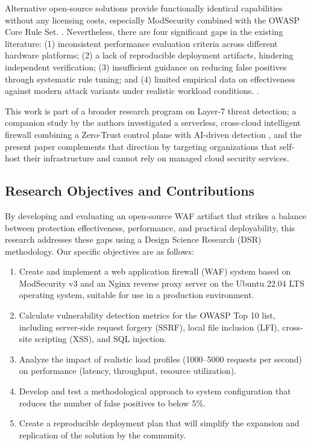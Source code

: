 \documentclass[10pt,conference]{IEEEtran}
\begin{document}
Alternative open-source solutions provide functionally identical capabilities without any licensing costs, especially ModSecurity combined with the OWASP Core Rule Set. \cite{owasp_modsec,mukhtar2020}. Nevertheless, there are four significant gaps in the existing literature: (1) inconsistent performance evaluation criteria across different hardware platforms; (2) a lack of reproducible deployment artifacts, hindering independent verification; (3) insufficient guidance on reducing false positives through systematic rule tuning; and (4) limited empirical data on effectiveness against modern attack variants under realistic workload conditions. \cite{pratama2023,gzyl2023}.

This work is part of a broader research program on Layer-7 threat detection; a companion study by the authors investigated a serverless, cross-cloud intelligent firewall combining a Zero-Trust control plane with AI-driven detection \cite{chowdhury2026serverless}, and the present paper complements that direction by targeting organizations that self-host their infrastructure and cannot rely on managed cloud security services.

\subsection{Research Objectives and Contributions}

By developing and evaluating an open-source WAF artifact that strikes a balance between protection effectiveness, performance, and practical deployability, this research addresses these gaps using a Design Science Research (DSR) methodology. Our specific objectives are as follows:

\begin{enumerate}
\item Create and implement a web application firewall (WAF) system based on ModSecurity v3 and an Nginx reverse proxy server on the Ubuntu 22.04 LTS operating system, suitable for use in a production environment.
\item Calculate vulnerability detection metrics for the OWASP Top 10 list, including server-side request forgery (SSRF), local file inclusion (LFI), cross-site scripting (XSS), and SQL injection.
\item Analyze the impact of realistic load profiles (1000–5000 requests per second) on performance (latency, throughput, resource utilization).
\item Develop and test a methodological approach to system configuration that reduces the number of false positives to below 5\%.
\item Create a reproducible deployment plan that will simplify the expansion and replication of the solution by the community.
\end{enumerate}
\end{document}

